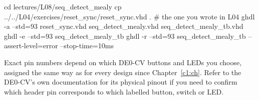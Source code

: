 \begin{shell}
cd lectures/L08/seq_detect_mealy
cp ../../L04/exercises/reset_sync/reset_sync.vhd .     # the one you wrote in L04
ghdl -a --std=93 reset_sync.vhd seq_detect_mealy.vhd seq_detect_mealy_tb.vhd
ghdl -e --std=93 seq_detect_mealy_tb
ghdl -r --std=93 seq_detect_mealy_tb --assert-level=error --stop-time=10ms
\end{shell}

\noindent Exact pin numbers depend on which DE0-CV buttons and LEDs you choose, assigned the same way
as for every design since Chapter~\ref{c1:ch}. Refer to the DE0-CV's own documentation for its
physical pinout if you need to confirm which header pin corresponds to which labelled button, switch
or LED.
